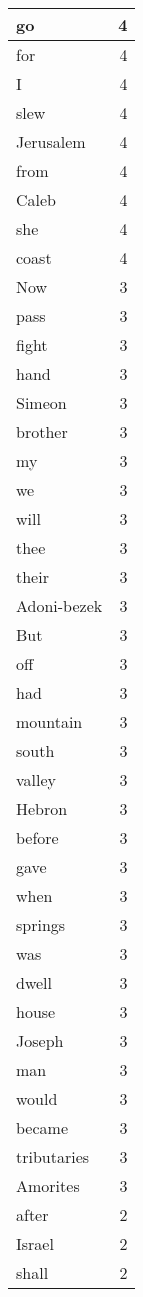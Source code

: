 \begin{center}
\begin{longtable}{l|r}
go & 4 \\ \hline
for & 4 \\ \hline
I & 4 \\ \hline
slew & 4 \\ \hline
Jerusalem & 4 \\ \hline
from & 4 \\ \hline
Caleb & 4 \\ \hline
she & 4 \\ \hline
coast & 4 \\ \hline
Now & 3 \\ \hline
pass & 3 \\ \hline
fight & 3 \\ \hline
hand & 3 \\ \hline
Simeon & 3 \\ \hline
brother & 3 \\ \hline
my & 3 \\ \hline
we & 3 \\ \hline
will & 3 \\ \hline
thee & 3 \\ \hline
their & 3 \\ \hline
Adoni-bezek & 3 \\ \hline
But & 3 \\ \hline
off & 3 \\ \hline
had & 3 \\ \hline
mountain & 3 \\ \hline
south & 3 \\ \hline
valley & 3 \\ \hline
Hebron & 3 \\ \hline
before & 3 \\ \hline
gave & 3 \\ \hline
when & 3 \\ \hline
springs & 3 \\ \hline
was & 3 \\ \hline
dwell & 3 \\ \hline
house & 3 \\ \hline
Joseph & 3 \\ \hline
man & 3 \\ \hline
would & 3 \\ \hline
became & 3 \\ \hline
tributaries & 3 \\ \hline
Amorites & 3 \\ \hline
after & 2 \\ \hline
Israel & 2 \\ \hline
shall & 2 \\ \hline

\end{longtable}
\end{center}
